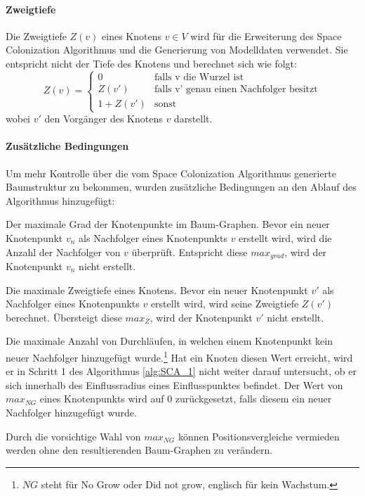 \paragraph{Zweigtiefe}

Die Zweigtiefe $Z(v)$ eines Knotens $v \in V$ wird für die Erweiterung des Space Colonization Algorithmus und die Generierung von Modelldaten verwendet. Sie entspricht nicht der Tiefe des Knotens und berechnet sich wie folgt:
\begin{equation}
Z(v)= \begin{cases}
0 & \text{falls v die Wurzel ist} \\
Z(v') & \text{falls v' genau einen Nachfolger besitzt}\\
1 + Z(v') & \text{sonst}
\end{cases} 
\end{equation}
wobei $v'$ den Vorgänger des Knotens $v$ darstellt. \cite[S. 21]{ABOP:04}\\

\paragraph{Zusätzliche Bedingungen}

Um mehr Kontrolle über die vom Space Colonization Algorithmus generierte Baumstruktur zu bekommen, wurden zusätzliche Bedingungen an den Ablauf des Algorithmus hinzugefügt:
\begin{description}[labelindent]
	\item[\boldmath$max_{grad}$] Der maximale Grad der Knotenpunkte im Baum-Graphen. Bevor ein neuer Knotenpunkt $v_n$ als Nachfolger eines Knotenpunkts $v$ erstellt wird, wird die Anzahl der Nachfolger von $v$ überprüft. Entspricht diese $max_{grad}$, wird der Knotenpunkt $v_n$ nicht erstellt.\\
	
	\item[\boldmath$max_{Z}$] Die maximale Zweigtiefe eines Knotens. Bevor ein neuer Knotenpunkt $v'$ als Nachfolger eines Knotenpunkts $v$ erstellt wird, wird seine Zweigtiefe $Z(v')$ berechnet. Übersteigt diese $max_{Z}$, wird der Knotenpunkt $v'$ nicht erstellt.\\
	
	\item[\boldmath$max_{NG}$] Die maximale Anzahl von Durchläufen, in welchen einem Knotenpunkt kein neuer Nachfolger hinzugefügt wurde.\footnote{$NG$ steht für \glqq No Grow\grqq{} oder \glqq Did not grow\grqq, englisch für \glqq kein Wachstum\grqq.} Hat ein Knoten diesen Wert erreicht, wird er in Schritt 1 des Algorithmus \ref{alg:SCA_1} nicht weiter darauf untersucht, ob er sich innerhalb des Einflussradius eines Einflusspunktes befindet. Der Wert von $max_{NG}$ eines Knotenpunkts wird auf $0$ zurückgesetzt, falls diesem ein neuer Nachfolger hinzugefügt wurde.
	
	Durch die vorsichtige Wahl von $max_{NG}$ können Positionsvergleiche vermieden werden ohne den resultierenden Baum-Graphen zu verändern.
\end{description}

